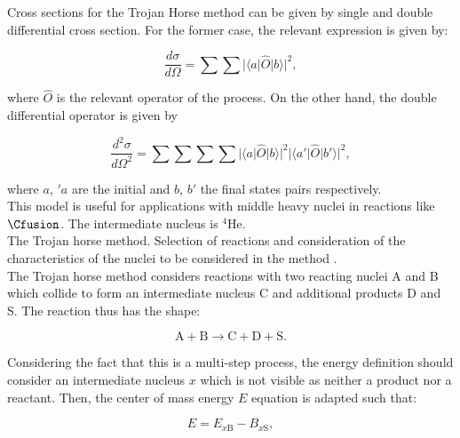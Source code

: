 \documentclass[openany]{book}
\begin{document}
Cross sections for the Trojan Horse method can be given by single and double differential cross section. For the former case, the relevant expression is given by: 

\begin{equation}\label{eq: special_differential_single}
	\frac{d\sigma}{d\Omega} = \sum \sum |\langle a | \hat O | b  \rangle|^2,
\end{equation}

where $\hat O$ is the relevant operator of the process. On the other hand, the double differential operator is given by 

\begin{equation}\label{eq: special_differential_double}
	\frac{d^2\sigma}{d\Omega^2} = \sum \sum \sum \sum  |\langle a | \hat O | b \rangle|^2 |\langle a' | \hat O | b' \rangle|^2,
\end{equation}

where $a$, $'a$ are the initial and $b$, $b'$ the final states pairs respectively. \\

This model is useful for applications with middle heavy nuclei in reactions like $\Cfusion$. The intermediate nucleus is $\mathrm{{}^{4}He}$. \\

The Trojan horse method. Selection of reactions and consideration of the characteristics of the nuclei to be considered in the method \cite{spitaleri_mukhamedzhanov_blokhintsev_cognata_pizzone_tumino_2011}. \\

The Trojan horse method considers reactions with two reacting nuclei A and B which collide to form an intermediate nucleus C and additional products D and S. The reaction thus has the shape:

\begin{equation}\label{eq:special_THM_reaction}
	\mathrm{A + B \rightarrow C + D + S}.
\end{equation}

Considering the fact that this is a multi-step process, the energy definition should consider an intermediate nucleus $x$ which is not visible as neither a product nor a reactant. Then, the center of mass energy $E$ equation is adapted such that: 

\begin{equation}\label{eq:special_THM_energy}
	E = E_{x\mathrm{B}} - B_{x\mathrm{S}},
\end{equation}
\end{document}
